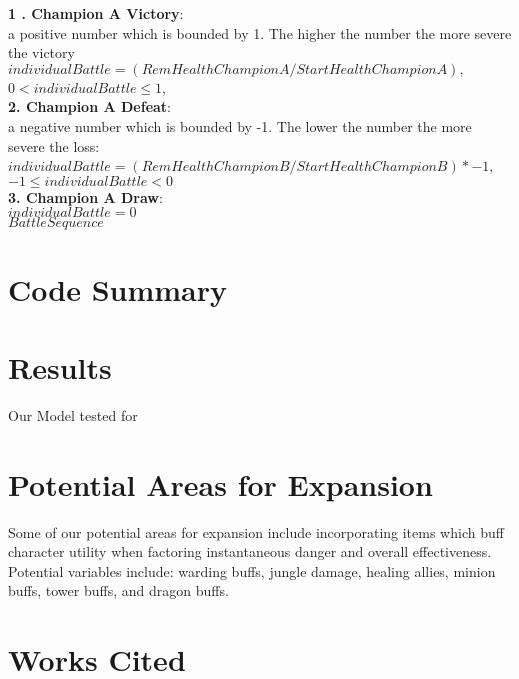 \documentclass{article}
\begin{document}
\newpage
{\bf{1 . Champion A Victory}}: \\ a positive number which is bounded by 1.  The higher the number the more severe the victory\\
$individualBattle = (Rem Health  Champion A/ Start Health Champion A),$ \\$0< individualBattle \leq 1$,    \\
{\bf{2.  Champion A Defeat}}:\\ a negative number which is bounded by -1.  The lower the number the more severe the loss:\\
$individualBattle = (Rem Health Champion B/ Start Health Champion B) * -1$,\\ $-1 \leq individualBattle < 0$\\
{\bf{3.  Champion A Draw}}: \\
$individualBattle = 0 $\\

$Battle Sequence$




\newpage
\section{Code Summary}
\newpage
\section{Results}
Our Model tested for 
\newpage
\section{Potential Areas for Expansion}
Some of our potential areas for expansion include incorporating items which buff character utility when factoring instantaneous danger and overall effectiveness.  Potential variables include: warding buffs, jungle damage, healing allies, minion buffs, tower buffs, and dragon buffs.
\newpage
\section{Works Cited}
\end{document}

